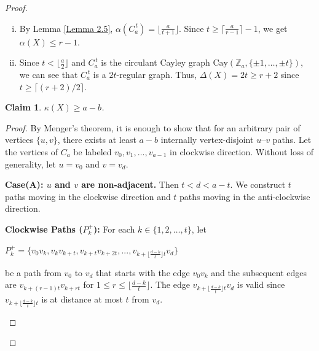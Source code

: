 \documentclass[12pt,reqno,a4paper]{amsart}
\theoremstyle{definition}
\newtheorem{claim}[defn]{Claim}
\begin{document}
\begin{proof}
\begin{enumerate}[(i)]
    \item 
By Lemma \ref{Lemma 2.5}, $\alpha(C_a^{\,t})=\lfloor \frac{a}{t+1}\rfloor$. Since
$t\ge\lceil \frac{a}{r-1}\rceil-1$, we get $\alpha(X)\le r-1$.
   \item Since $t<\lfloor \frac{a}{2}\rfloor$ and $C_a^{\,t}$ is the circulant Cayley graph $\mathrm{Cay}(\mathbb Z_a,\{\pm1,\dots,\pm t\})$, we can see that $C_a^{\,t}$ is a $2t$-regular graph. Thus, $\Delta(X)=2t\ge r+2$ since
$t\ge\lceil(r+2)/2\rceil$. 
\end{enumerate}
 
\begin{claim}\label{Claim 4.6}
    {\em $\kappa(X)\geq a-b$.}
\end{claim}

\begin{proof}
By Menger's theorem, it is enough to show that for an arbitrary pair of vertices $\{u,v\}$, there exists at least $a-b$ internally vertex-disjoint $u$--$v$ paths. 
Let the vertices of $C_a$ be labeled $v_0, v_1, \dots, v_{a-1}$ in clockwise direction. 
Without loss of generality, let $u = v_0$ and $v = v_d$.

\textbf{Case(A): $u$ and $v$ are non-adjacent.}
Then $t < d < a-t$.
We construct $t$ paths moving in the clockwise direction and $t$ paths moving in the anti-clockwise direction.

\textbf{Clockwise Paths ($P_k^+$):}
For each $k \in \{1, 2, \dots, t\}$, let 
\begin{center}
$P_k^+=\{v_{0}v_{k}, v_{k}v_{k+t},v_{k+t}v_{k+2t},...,  v_{k+\lfloor \frac{d-k}{t} \rfloor t} v_d\}$ 
\end{center}

be a path from $v_0$ to $v_d$ that starts with the edge $v_0 v_k$ and the subsequent edges are
$v_{k+(r-1)t}v_{k+rt}$ for $1\leq r\leq {\lfloor \frac{d-k}{t} \rfloor }$.
The edge $v_{k+\lfloor \frac{d-k}{t} \rfloor t} v_{d}$ is valid since $v_{{k+\lfloor \frac{d-k}{t}} \rfloor t}$ is at distance at most $t$ from $v_d$.

\begin{figure}[h]
\centering

\end{figure}
\end{proof}
\end{proof}
\end{document}
